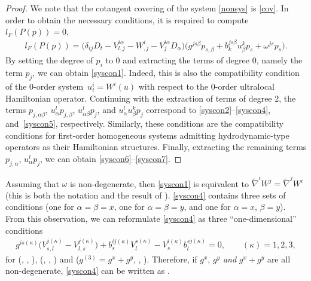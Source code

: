 \documentclass[10pt,a4paper]{amsart}
\numberwithin{equation}{section}
\begin{document}
\begin{proof}
We note that the cotangent covering of the system \eqref{nonsys} is \eqref{cov}. In order to obtain the necessary conditions, it is required to compute $l_F(P(p))=0$,
\begin{gather*}
l_F(P(p))=\big(\delta_{ij}D_t-V^{i\alpha}_{l,j}-W^i_{,j}-V^{i\alpha}_jD_\alpha\big)\big(g^{js\beta}p_{s,\beta}+b^{js\beta}_ku^k_\beta p_s+\omega^{js}p_s\big).
\end{gather*}
By setting the degree of $p_i$ to 0 and extracting the terms of degree 0, namely the term $p_j$, we can obtain \eqref{syscon1}. Indeed, this is also the compatibility condition of the 0-order system~${u^i_t=W^i(u)}$ with respect to the 0-order ultralocal Hamiltonian operator. Continuing with the extraction of terms of degree 2, the terms $p_{j,\alpha\beta}$, $u^l_\alpha p_{j,\beta}$, $u^l_{\alpha\beta} p_j$, and $u^l_\alpha u^k_\beta p_j$ correspond to \eqref{syscon2}--\eqref{syscon4}, and~\eqref{syscon5}, respectively. Similarly, these conditions are the compatibility conditions for first-order homogeneous systems admitting hydrodynamic-type operators as their Hamiltonian structures. Finally, extracting the remaining terms $p_{j,\alpha}$, $u^l_\alpha p_j$, we can obtain \eqref{syscon6}--\eqref{syscon7}.
\end{proof}


\begin{Remark}
Assuming that $\omega$ is non-degenerate, then \eqref{syscon1} is equivalent to $\tilde{\nabla}^iW^j=\tilde{\nabla}^jW^i$ (this is both the notation and the result of \cite{vergallo2023non}). \eqref{syscon4} contains three sets of conditions (one for $\alpha=\beta=x$, one for $\alpha=\beta=y$, and one for $\alpha=x$, $\beta=y$). From this observation, we can reformulate \eqref{syscon4} as three ``one-dimensional'' conditions
\begin{gather*}
g^{is(\kappa)}\big(V^{j(\kappa)}_{s,l}-V^{j(\kappa)}_{l,s}\big)+b^{ij(\kappa)}_sV^{s(\kappa)}_l-V^{i(\kappa)}_sb^{sj(\kappa)}_l=0,\qquad(\kappa)=1,2,3,
\end{gather*}
for \big(, , \big), \big(, , \big) and \big($g^{(3)}=g^x+g^y$, , \big). Therefore, if $g^x$, $g^y$ \emph{and} $g^x+g^y$ are all non-degenerate, \eqref{syscon4} can be written as .
\end{Remark}
\end{document}
